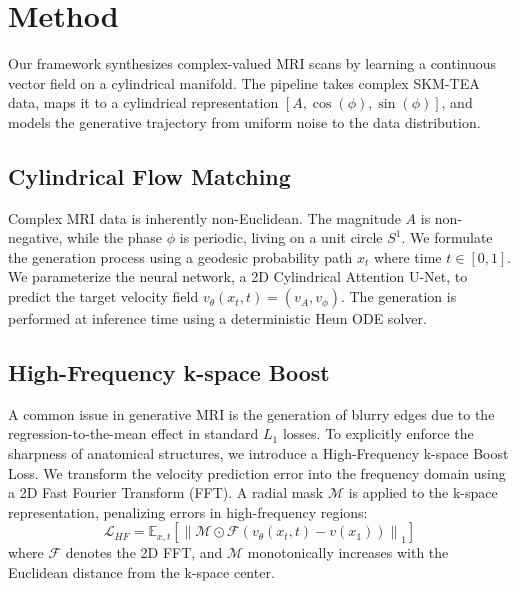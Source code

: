 \section{Method}
\label{sec:method}

Our framework synthesizes complex-valued MRI scans by learning a continuous vector field on a cylindrical manifold. The pipeline takes complex SKM-TEA data, maps it to a cylindrical representation $[A, \cos(\phi), \sin(\phi)]$, and models the generative trajectory from uniform noise to the data distribution.

\subsection{Cylindrical Flow Matching}
Complex MRI data is inherently non-Euclidean. The magnitude $A$ is non-negative, while the phase $\phi$ is periodic, living on a unit circle $S^1$. We formulate the generation process using a geodesic probability path $x_t$ where time $t \in [0, 1]$. We parameterize the neural network, a 2D Cylindrical Attention U-Net, to predict the target velocity field $v_\theta(x_t, t) = (v_A, v_\phi)$. The generation is performed at inference time using a deterministic Heun ODE solver.

\subsection{High-Frequency k-space Boost}
A common issue in generative MRI is the generation of blurry edges due to the regression-to-the-mean effect in standard $L_1$ losses. To explicitly enforce the sharpness of anatomical structures, we introduce a High-Frequency k-space Boost Loss. We transform the velocity prediction error into the frequency domain using a 2D Fast Fourier Transform (FFT). A radial mask $\mathcal{M}$ is applied to the k-space representation, penalizing errors in high-frequency regions:
$$
\mathcal{L}_{HF} = \mathbb{E}_{x, t} \left[ \left\| \mathcal{M} \odot \mathcal{F}(v_\theta(x_t, t) - v(x_1)) \right\|_1 \right]
$$
where $\mathcal{F}$ denotes the 2D FFT, and $\mathcal{M}$ monotonically increases with the Euclidean distance from the k-space center.